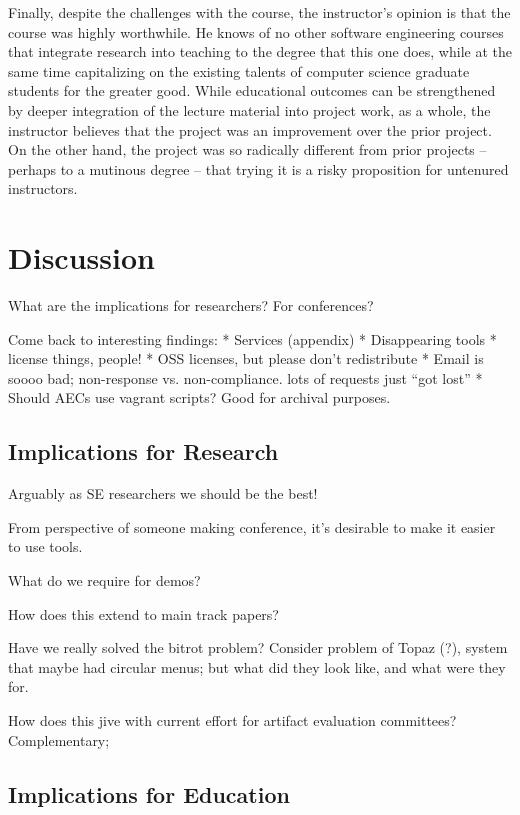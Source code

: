 \documentclass[10pt,conference]{IEEEtran}
\begin{document}
Finally, despite the challenges with the course, the instructor's opinion is that 
the course was highly worthwhile.
He knows of no other software engineering courses that integrate research into 
teaching to the degree that this one does, while at the same time capitalizing
on the existing talents of computer science graduate students for the greater 
good.
While educational outcomes can be strengthened by deeper integration of the lecture
material into project work, as a whole, the instructor believes that 
the project was an improvement over the prior project.
On the other hand, the project was so radically different from prior 
projects -- perhaps to a mutinous degree -- that trying it is a risky 
proposition for untenured instructors.

\section{Discussion}

What are the implications for researchers? For conferences?

Come back to interesting findings:
* Services (appendix)
* Disappearing tools
* license things, people!
* OSS licenses, but please don't redistribute
* Email is soooo bad; non-response vs. non-compliance. lots of requests just ``got lost''
* Should AECs use vagrant scripts? Good for archival purposes.

\subsection{Implications for Research}

Arguably as SE researchers we should be the best!

From perspective of someone making conference, it's 
desirable to make it easier to use tools.

What do we require for demos?

How does this extend to main track papers?

Have we really solved the bitrot problem?
Consider problem of Topaz (?), system that
maybe had circular menus; but what did they
look like, and what were they for.

How does this jive with current effort for artifact
evaluation committees?
Complementary; 

\subsection{Implications for Education}
\end{document}

